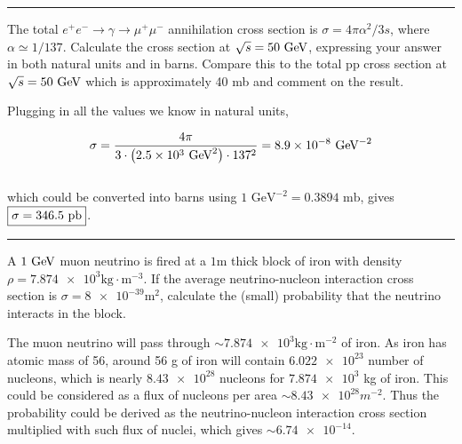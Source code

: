 \noindent\rule{7in}{1.5pt}


\begin{problem}{3.5}
The total $e^+e^-\to\gamma\to\mu^+\mu^-$ annihilation cross section is $\sigma = 4\pi\alpha^2/3s$, where $\alpha \simeq 1/137$. 
Calculate the cross section at $\sqrt{s}=50\text{ GeV}$, expressing your answer in both natural units and in barns.
Compare this to the total pp cross section at $\sqrt{s}=50\text{ GeV}$ which is approximately 40 mb and comment on the result.
\end{problem}
\begin{solution}
Plugging in all the values we know in natural units,

\begin{align*}
    \sigma = \frac{4\pi}{3\cdot \left( \num{2.5e3} \text{ GeV}^2 \right)\cdot 137^2} = \num{8.9e-8} \text{ GeV}^{-2}
\end{align*}\\
which could be converted into barns using $1\text{ GeV}^{-2} = 0.3894 \text{ mb}$, gives $\boxed{\sigma = 346.5 \text{ pb}}$.
\end{solution} 
    
\noindent\rule{7in}{1.5pt}
    


\begin{problem}{3.6}
A $1\text{ GeV}$ muon neutrino is fired at a $1\unit{\metre}$ thick block of iron with density $\rho=\num{7.874e3}\unit{\kilo\gram\cdot\metre^{-3}}$.
If the average neutrino-nucleon interaction cross section is $\sigma=\num{8e-39}\unit{\square\metre}$, calculate the (small) probability that the neutrino interacts in the block.
\end{problem}
\begin{solution}
    The muon neutrino will pass through $\sim \num{7.874e3}\unit{\kilo\gram\cdot\metre^{-2}}$ of iron. As iron has atomic mass of 56, around 56 g of iron will contain $\num{6.022e23}$ number of nucleons, 
    which is nearly $\num{8.43e28}$ nucleons for $\num{7.874e3}$ kg of iron. This could be considered as a flux of nucleons per area $\sim \num{8.43e28} \unit{m^{-2}}$. Thus the probability could be derived as 
    the neutrino-nucleon interaction cross section multiplied with such flux of nuclei, which gives $\boxed{\sim \num{6.74e-14}}$.
\end{solution} 
    
